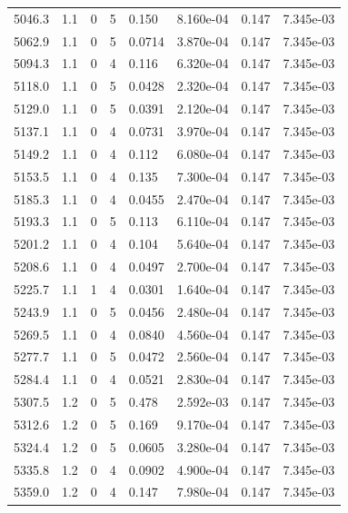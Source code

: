 \documentclass[preview]{standalone}
\begin{document}
{{{{{{{{{{{\begin{tabular}{L{1.2cm}C{1.2cm} C{0.3cm}C{0.5cm} C{1.4cm}C{1.4cm} C{1.4cm}C{1.4cm}}
  5046.3  &   1.1  & 0     &  5 &  0.150  & 8.160e-04  & 0.147 &  7.345e-03   \\ 
  5062.9  &   1.1  & 0     &  5 &  0.0714  & 3.870e-04  & 0.147 &  7.345e-03   \\ 
  5094.3  &   1.1  & 0     &  4 &  0.116  & 6.320e-04  & 0.147 &  7.345e-03   \\ 
  5118.0  &   1.1  & 0     &  5 &  0.0428  & 2.320e-04  & 0.147 &  7.345e-03   \\ 
  5129.0  &   1.1  & 0     &  5 &  0.0391  & 2.120e-04  & 0.147 &  7.345e-03   \\ 
  5137.1  &   1.1  & 0     &  4 &  0.0731  & 3.970e-04  & 0.147 &  7.345e-03   \\ 
  5149.2  &   1.1  & 0     &  4 &  0.112  & 6.080e-04  & 0.147 &  7.345e-03   \\ 
  5153.5  &   1.1  & 0     &  4 &  0.135  & 7.300e-04  & 0.147 &  7.345e-03   \\ 
  5185.3  &   1.1  & 0     &  4 &  0.0455  & 2.470e-04  & 0.147 &  7.345e-03   \\ 
  5193.3  &   1.1  & 0     &  5 &  0.113  & 6.110e-04  & 0.147 &  7.345e-03   \\ 
  5201.2  &   1.1  & 0     &  4 &  0.104  & 5.640e-04  & 0.147 &  7.345e-03   \\ 
  5208.6  &   1.1  & 0     &  4 &  0.0497  & 2.700e-04  & 0.147 &  7.345e-03   \\ 
  5225.7  &   1.1  & 1     &  4 &  0.0301  & 1.640e-04  & 0.147 &  7.345e-03   \\ 
  5243.9  &   1.1  & 0     &  5 &  0.0456  & 2.480e-04  & 0.147 &  7.345e-03   \\ 
  5269.5  &   1.1  & 0     &  4 &  0.0840  & 4.560e-04  & 0.147 &  7.345e-03   \\ 
  5277.7  &   1.1  & 0     &  5 &  0.0472  & 2.560e-04  & 0.147 &  7.345e-03   \\ 
  5284.4  &   1.1  & 0     &  4 &  0.0521  & 2.830e-04  & 0.147 &  7.345e-03   \\ 
  5307.5  &   1.2  & 0     &  5 &  0.478  & 2.592e-03  & 0.147 &  7.345e-03   \\ 
  5312.6  &   1.2  & 0     &  5 &  0.169  & 9.170e-04  & 0.147 &  7.345e-03   \\ 
  5324.4  &   1.2  & 0     &  5 &  0.0605  & 3.280e-04  & 0.147 &  7.345e-03   \\ 
  5335.8  &   1.2  & 0     &  4 &  0.0902  & 4.900e-04  & 0.147 &  7.345e-03   \\ 
  5359.0  &   1.2  & 0     &  4 &  0.147  & 7.980e-04  & 0.147 &  7.345e-03   \\ 

\end{tabular}}}}}}}}}}}}
\end{document}
